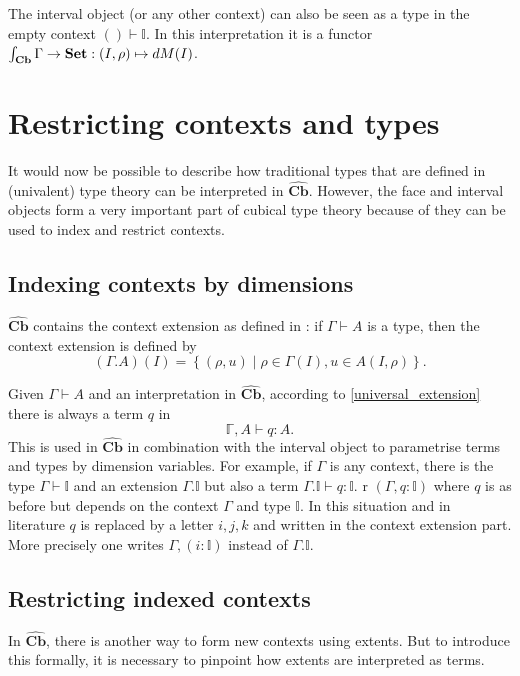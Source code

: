 \documentclass[12pt,a4paper,twoside,xetex]{book} %
\newcommand{\psh}[1]{\widehat{#1}}
\newcommand{\cube}[0]{\textbf{Cb}}
\begin{document}
The interval object (or any other context) can also be seen as a type in the empty context $() \vdash \mathbb{I}$. In this interpretation it is a functor  $\int_{\cube} \Gamma \rightarrow 
\set : (I,\rho) \mapsto dM(I)$.



\section{Restricting contexts and types}

It would now be possible to describe how traditional types that are defined in 
(univalent) type theory can be interpreted in $\psh{\cube}$. However, the face and interval objects form a very important part of cubical 
type theory because of they can be used to index and restrict contexts.  

\subsection{Indexing contexts by dimensions}\label{contextindexing}

$\psh{\cube}$ contains the context extension as defined in 
: if $\Gamma \vdash A$ is a type, then the context extension is 
defined by $$(\Gamma . A)(I) = \left\{ (\rho , u ) \mid \rho \in \Gamma (I), u 
\in A (I,\rho) \right\}.$$

Given $\Gamma \vdash A$ and an interpretation in $\psh{\cube}$, according to \cref{universal_extension} there is 
always a term $q$ in $$\mathbb{\Gamma}, A \vdash q : A.$$ This is used in 
$\psh{\cube}$ in combination with the interval object to parametrise 
terms and types by dimension variables. For example, if $\Gamma$ is any context, 
there is the type $\Gamma \vdash \mathbb{I}$ and an extension $\Gamma. 
\mathbb{I}$ but also a term $\Gamma. \mathbb{I} \vdash q : \mathbb{I}$.
r $(\Gamma, q : \mathbb{I})$ where $q$ is as before but depends on the context 
$\Gamma$ and type $\mathbb{I}$. In this situation and in literature $q$ is 
replaced by a letter $i,j,k$ and written in the context extension part. More 
precisely one writes $\Gamma, (i: \mathbb{I})$ instead of $\Gamma . 
\mathbb{I}$. 

\subsection{Restricting indexed contexts}

In $\psh{\cube}$, there is another way to form new 
contexts using extents. But to introduce this formally, it is necessary to 
pinpoint how extents are interpreted as terms.
\end{document}
